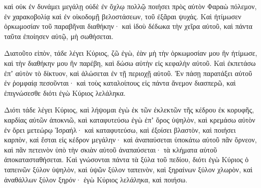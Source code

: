 {καὶ οὐκ ἐν δυνάμει μεγάλῃ οὐδὲ ἐν ὄχλῳ πολλῷ ποιήσει πρὸς αὐτὸν Φαραὼ πόλεμον, ἐν χαρακοβολίᾳ καὶ ἐν οἰκοδομῇ βελοστάσεων, τοῦ ἐξᾶραι ψυχάς.
Καὶ ἠτίμωσεν ὁρκωμοσίαν τοῦ παραβῆναι διαθήκην· καὶ ἰδοὺ δέδωκα τὴν χεῖρα αὐτοῦ, καὶ πάντα ταῦτα ἐποίησεν αὐτῷ, μὴ σωθήσεται.
\par }{\PP {}Διατοῦτο εἰπὸν, τάδε λέγει Κύριος, ζῶ ἐγὼ, ἐὰν μὴ τὴν ὁρκωμοσίαν μου ἣν ἠτίμωσε, καὶ τὴν διαθήκην μου ἣν παρέβη, καὶ δώσω αὐτὴν εἰς κεφαλὴν αὐτοῦ.
Καὶ ἐκπετάσω ἐπʼ αὐτὸν τὸ δίκτυον, καὶ ἁλώσεται ἐν τῇ περιοχῇ αὐτοῦ.
Ἐν πάσῃ παρατάξει αὐτοῦ ἐν ῥομφαίᾳ πεσοῦνται· καὶ τοὺς καταλοίπους εἰς πάντα ἄνεμον διασπερῶ, καὶ ἐπιγνώσεσθε διότι ἐγὼ Κύριος λελάληκα.
\par }{\PP {}Διότι τάδε λέγει Κύριος, καὶ λήψομαι ἐγὼ ἐκ τῶν ἐκλεκτῶν τῆς κέδρου ἐκ κορυφῆς, καρδίας αὐτῶν ἀποκνιῶ, καὶ καταφυτεύσω ἐγὼ ἐπʼ ὄρος ὑψηλὸν,
καὶ κρεμάσω αὐτὸν ἐν ὄρει μετεώρῳ Ἰσραήλ· καὶ καταφυτεύσω, καὶ ἐξοίσει βλαστὸν, καὶ ποιήσει καρπὸν, καὶ ἔσται εἰς κέδρον μεγάλην· καὶ ἀναπαύσεται ὑποκάτω αὐτοῦ πᾶν ὄρνεον, καὶ πᾶν πετεινὸν ὑπὸ τὴν σκιὰν αὐτοῦ ἀναπαύσεται· τὰ κλήματα αὐτοῦ ἀποκατασταθήσεται.
Καὶ γνώσονται πάντα τὰ ξύλα τοῦ πεδίου, διότι ἐγὼ Κύριος ὁ ταπεινῶν ξύλον ὑψηλὸν, καὶ ὑψῶν ξύλον ταπεινὸν, καὶ ξηραίνων ξύλον χλωρὸν, καὶ ἀναθάλλων ξύλον ξηρόν· ἐγὼ Κύριος λελάληκα, καὶ ποιήσω.

}
